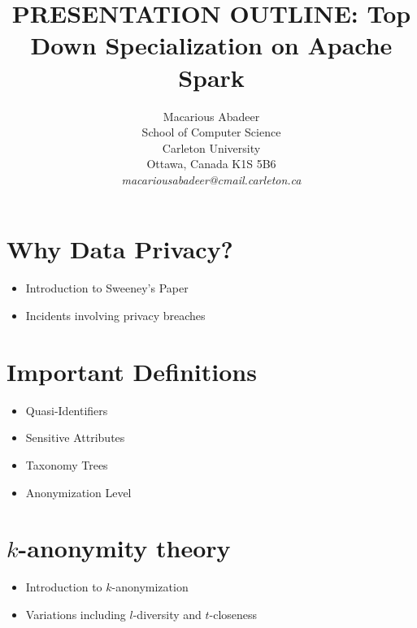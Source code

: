\documentclass[11pt]{article}       %
\newenvironment{slide}[1]        {\section{#1} \begin{itemize}}%
                                 {\end{itemize}}
\begin{document}


\title{PRESENTATION OUTLINE: Top Down Specialization on Apache Spark\texttrademark}


\author{
Macarious Abadeer\\
School of Computer Science\\
Carleton University\\
Ottawa, Canada K1S 5B6\\
{\em macariousabadeer@cmail.carleton.ca}
} %

\maketitle

\begin{slide}{Why Data Privacy?}
\item Introduction to Sweeney's Paper
\item Incidents involving privacy breaches
\end{slide}

\begin{slide}{Important Definitions}
\item Quasi-Identifiers
\item Sensitive Attributes
\item Taxonomy Trees
\item Anonymization Level
\end{slide}

\begin{slide}{$k$-anonymity theory}
\item Introduction to $k$-anonymization
\item Variations including $l$-diversity and $t$-closeness
\end{slide}
\end{document}
